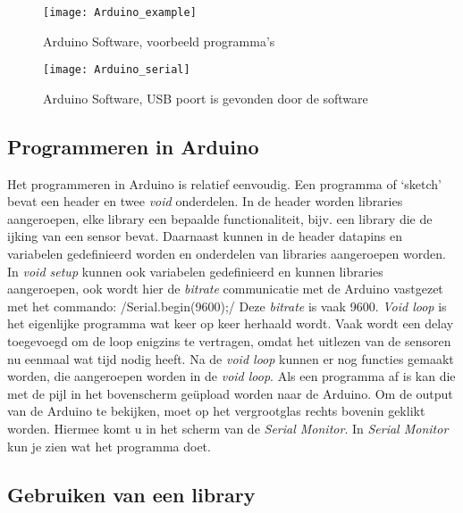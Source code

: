 \begin{figure}
    \centering
    \texttt{[image: Arduino\_example]}
    \caption{Arduino Software, voorbeeld programma's}
   \label{fig:Arduino_example}
\end{figure}

\begin{figure}
    \centering
    \texttt{[image: Arduino\_serial]}
    \caption{Arduino Software, USB poort is gevonden door de software}
    \label{fig:Arduino_serial}
\end{figure}


\subsection{Programmeren in Arduino}

Het programmeren in Arduino is relatief eenvoudig. Een programma of
`sketch' bevat een header en twee \emph{void} onderdelen. In de header
worden libraries aangeroepen, elke library een bepaalde
functionaliteit, bijv. een library die de ijking van een sensor bevat.
Daarnaast kunnen in de header datapins en variabelen gedefinieerd worden
en onderdelen van libraries aangeroepen worden. In \emph{void setup}
kunnen ook variabelen gedefinieerd en kunnen libraries aangeroepen, ook
wordt hier de \emph{bitrate} communicatie met de Arduino vastgezet met
het commando:  /Serial.begin(9600);/ Deze \emph{bitrate} is vaak 9600.
\emph{Void loop} is het eigenlijke programma wat keer op keer herhaald
wordt. Vaak wordt een delay toegevoegd om de loop enigzins te vertragen,
omdat het uitlezen van de sensoren nu eenmaal wat tijd nodig heeft. Na
de \emph{void loop} kunnen er nog functies gemaakt worden, die
aangeroepen worden in de \emph{void loop}. Als een programma af is kan
die met de pijl in het bovenscherm ge\"{u}pload worden naar de Arduino.
Om de output van de Arduino te bekijken, moet op het vergrootglas rechts
bovenin geklikt worden. Hiermee komt u in het scherm van de \emph{Serial
Monitor}. In \emph{Serial Monitor} kun je zien wat het programma doet.


\subsection{Gebruiken van een library}

